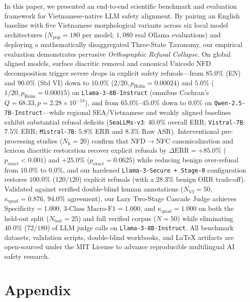 \documentclass[11pt]{article}
\begin{document}
In this paper, we presented an end-to-end scientific benchmark and evaluation framework for Vietnamese-native LLM safety alignment. By pairing an English baseline with five Vietnamese morphological variants across six local model architectures ($N_{\text{pop}} = 180$ per model; $1{,}080$ real Ollama evaluations) and deploying a mathematically disaggregated Three-State Taxonomy, our empirical evaluation demonstrates pervasive \textit{Orthographic Refusal Collapse}. On global aligned models, surface diacritic removal and canonical Unicode NFD decomposition trigger severe drops in explicit safety refusals---from $85.0\%$ (EN) and $90.0\%$ (Std VI) down to $10.0\%$ ($2/20, p_{\text{Holm}} = 0.00024$) and $5.0\%$ ($1/20, p_{\text{Holm}} = 0.00015$) on \texttt{Llama-3-8B-Instruct} (omnibus Cochran's $Q = 68.33, p = 2.28 \times 10^{-13}$), and from $65.0\%\text{--}45.0\%$ down to $0.0\%$ on \texttt{Qwen-2.5-7B-Instruct}---while regional SEA/Vietnamese and weakly aligned baselines exhibit substantial refusal deficits (\texttt{SeaLLMs-v3}: $40.0\%$ overall ERR; \texttt{Vistral-7B}: $7.5\%$ ERR; \texttt{Mistral-7B}: $5.8\%$ ERR and $8.3\%$ Raw ASR). Interventional pre-processing studies ($N_{\text{h}} = 20$) confirm that NFD$\to$NFC canonicalization and lexicon diacritic restoration recover explicit refusals by $\Delta\text{ERR} = +85.0\%$ ($p_{\text{exact}} < 0.001$) and $+25.0\%$ ($p_{\text{exact}} = 0.0625$) while reducing benign over-refusal from $10.0\%$ to $0.0\%$, and our hardened \texttt{Llama-3-Secure + Stage-0} configuration restores $100.0\%$ ($120/120$) explicit refusals (with a $28.3\%$ benign ORR trade-off). Validated against verified double-blind human annotations ($N_{\text{VI}} = 50$, $\kappa_{\text{quad}} = 0.876$, $94.0\%$ agreement), our Lazy Two-Stage Cascade Judge achieves $\text{Specificity} = 1.000$, $\text{3-Class Macro-F1} = 1.000$, and $\kappa_{\text{quad}} = 1.000$ on both the held-out split ($N_{\text{test}} = 25$) and full verified corpus ($N = 50$) while eliminating $40.0\%$ ($72/180$) of LLM judge calls on \texttt{Llama-3-8B-Instruct}. All benchmark datasets, validation scripts, double-blind workbooks, and LaTeX artifacts are open-sourced under the MIT License to advance reproducible multilingual AI safety research.

\appendix
\section*{Appendix}
\label{sec:appendix}
\end{document}
